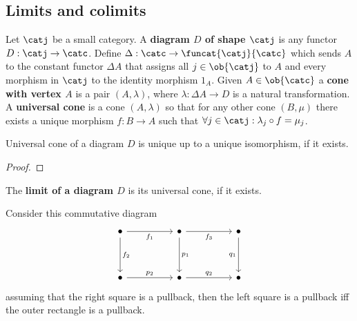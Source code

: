 \subsection{Limits and colimits}
\begin{definition}
    Let $\catj$ be a small category. A \textbf{diagram $D$ of shape $\catj$} is
    any functor $D: \catj \to \catc$. Define $\Delta:\catc\to\funcat{\catj}{\catc}$
    which sends $A$ to the constant functor $\Delta A$ that 
    assigns all $j\in\ob{\catj}$ to $A$ and every morphism in $\catj$ 
    to the identity morphism $1_A$. Given $A\in\ob{\catc}$ a \textbf{cone with vertex $A$}
    is a pair $(A,\lambda)$, where $\lambda:\Delta A\to D$ is a natural transformation.
    A \textbf{universal cone} is a cone $(A,\lambda)$ so that for any other
    cone $(B,\mu)$ there exists a unique morphism $f: B\to A$ such that
    $\forall j\in\catj : \lambda_j \circ f = \mu_j$.
\end{definition}
\begin{lemma}
    Universal cone of a diagram $D$ is unique up to a unique isomorphism, if it exists.
\end{lemma}
\begin{proof}[Proof]
    
\end{proof}
\begin{definition}
    The \textbf{limit of a diagram $D$} is its universal cone, if it exists.
\end{definition}
\begin{lemma}
    Consider this commutative diagram
    \[\begin{tikzcd}
	\bullet && \bullet && \bullet \\
	\\
	\bullet && \bullet && \bullet
	\arrow["{f_1}"', from=1-1, to=1-3]
	\arrow["{f_2}", from=1-1, to=3-1]
	\arrow["{f_3}"', from=1-3, to=1-5]
	\arrow["{p_1}", from=1-3, to=3-3]
	\arrow["{q_1}"', from=1-5, to=3-5]
	\arrow["{p_2}", from=3-1, to=3-3]
	\arrow["{q_2}", from=3-3, to=3-5]
\end{tikzcd}\]
    assuming that the right square is a pullback, then 
    the left square is a pullback iff the outer rectangle
    is a pullback.
\end{lemma}
